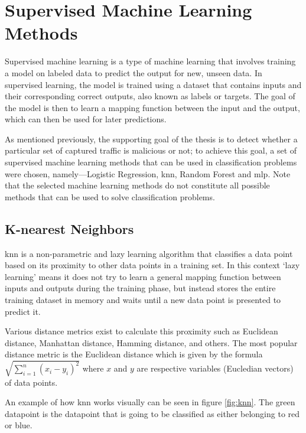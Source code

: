 \section{Supervised Machine Learning Methods}\label{sec:ml-methods}

Supervised machine learning is a type of machine learning that involves training a model on labeled data to predict the output for new, unseen data. In supervised learning, the model is trained using a dataset that contains inputs and their corresponding correct outputs, also known as labels or targets. The goal of the model is then to learn a mapping function between the input and the output, which can then be used for later predictions. \cite{JIANG2020675}

As mentioned previously, the supporting goal of the thesis is to detect whether a particular set of captured traffic is malicious or not;
to achieve this goal, a set of supervised machine learning methods that can be used in classification problems were chosen,
namely---Logistic Regression, \gls{knn}, Random Forest and \gls{mlp}. Note that the selected machine learning methods do not constitute all possible methods that can be used to solve classification problems.

\subsection{K-nearest Neighbors}\label{knn:theory}

\gls{knn} is a non-parametric and lazy learning algorithm that classifies a data point based on its proximity to other data points in a training set.
In this context `lazy learning' means it does not try to learn a general mapping function between inputs and outputs during the training phase, but instead stores the entire training dataset in memory and waits until a new data point is presented to predict it.

Various distance metrics exist to calculate this proximity such as Euclidean distance, Manhattan distance, Hamming distance, and others.
The most popular distance metric is the Euclidean distance which is given by the formula $\sqrt {\sum\nolimits_{i = 1}^n {{{\left( {{x_i} - {y_i}} \right)}^2}} }$ where $x$ and $y$ are respective variables (Eucledian vectors) of data points. \cite{ieee:knn}

An example of how \gls{knn} works visually can be seen in figure \ref{fig:knn}.
The green datapoint is the datapoint that is going to be classified as either belonging to red or blue.

